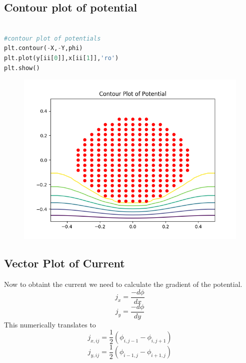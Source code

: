 \documentclass[a4paper]{article}
\begin{document}
\subsection{Contour plot of potential}
\begin{lstlisting}[language=Python]

#contour plot of potentials
plt.contour(-X,-Y,phi)
plt.plot(y[ii[0]],x[ii[1]],'ro')
plt.show()
\end{lstlisting}
\begin{figure}
\caption{}
\includegraphics{Figure_1-4.png}
\end{figure}

\subsection{Vector Plot of Current}
Now to obtaint the current we need to calculate the gradient of the potential.
$$ j_{x} = \frac{-d\phi}{dx}$$
$$ j_{y} = \frac{-d\phi}{dy}$$
This numerically translates to
$$ j_{x,ij} =  \frac{1}{2}(\phi_{i,j-1} - \phi_{i,j+1})$$
$$ j_{y,ij} =  \frac{1}{2}(\phi_{i-1,j} - \phi_{i+1,j})$$
\end{document}
